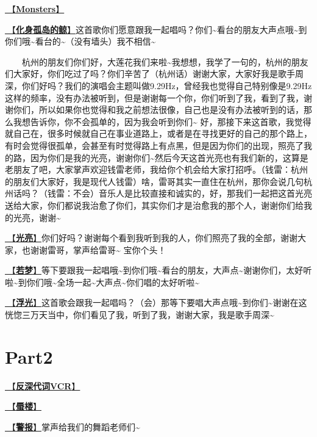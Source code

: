 \documentclass[]{ctexbook}
\begin{document}
\hyperref[Monsters]{🎵【\textbf{Monsters}】}

\hyperref[hua-shen-gu-dao-de-jing]{🎵【\textbf{化身孤岛的鲸}】}这首歌你们愿意跟我一起唱吗？你们\textasciitilde 看台的朋友大声点哦\textasciitilde 到你们哦\textasciitilde 看台的\textasciitilde（没有墙头）我不相信\textasciitilde{}

  杭州的朋友们你们好，大莲花我们来啦\textasciitilde 我想想，我学了一句的，杭州的朋友们大家好，你们吃过了吗？你们辛苦了（杭州话）谢谢大家，大家好我是歌手周深，你们好吗？我们的演唱会主题叫做9.29Hz，曾经我也觉得自己特别像是9.29Hz这样的频率，没有办法被听到，但是谢谢每一个你，你们听到了我，看到了我，谢谢你们，所以如果你也觉得和我之前想法很像，自己也是没有办法被听到的话，那么我想告诉你，你不会孤单的，因为我会听到你们\textasciitilde{}
好，那接下来这首歌，我觉得就自己在，很多时候就自己在事业道路上，或者是在寻找更好的自己的那个路上，有时会觉得很孤单，会甚至有时觉得路上有点黑，但是因为你们的出现，照亮了我的路，因为你们是我的光亮，谢谢你们\textasciitilde 然后今天这首光亮也有我们新的，这算是老朋友了吧，大家掌声欢迎钱雷老师，我给你个机会给大家打招呼。（钱雷：杭州的朋友们大家好，我是现代人钱雷）啥，雷哥其实一直住在杭州，那你会说几句杭州话吗？（钱雷：不会）音乐人是比较直接和诚实的，好，那我们一起把这首光亮送给大家，你们都说我治愈了你们，其实你们才是治愈我的那个人，谢谢你们给我的光亮，谢谢\textasciitilde{}

\hyperref[silver-linings]{🎵【\textbf{光亮}】}你们好吗？谢谢每个看到我听到我的人，你们照亮了我的全部，谢谢大家，也谢谢雷哥，掌声给雷哥\textasciitilde{}
宝你个头！

\hyperref[ruomeng]{🎵【\textbf{若梦}】}等下要跟我一起唱哦\textasciitilde 到你们哦\textasciitilde 看台的朋友，大声点\textasciitilde 谢谢你们，太好听啦\textasciitilde 到你们哦\textasciitilde 全场一起\textasciitilde 大声点\textasciitilde 你们唱的太好听啦\textasciitilde{}

\hyperref[floating-light]{🎵【\textbf{浮光}】}这首歌会跟我一起唱吗？（会）那等下要唱大声点哦\textasciitilde 到你们\textasciitilde 谢谢在这恍惚三万天当中，你们看见了我，听到了我，谢谢大家，我是歌手周深\textasciitilde{}

\section{Part2}\label{hangzhou-20240823-part2}

\hyperref[senself-vcr]{🎥【\textbf{反深代词VCR}】}

\hyperref[mirage]{🎵【\textbf{蜃楼}】}

\hyperref[the-giver]{🎵【\textbf{警报}】}掌声给我们的舞蹈老师们\textasciitilde{}
\end{document}
